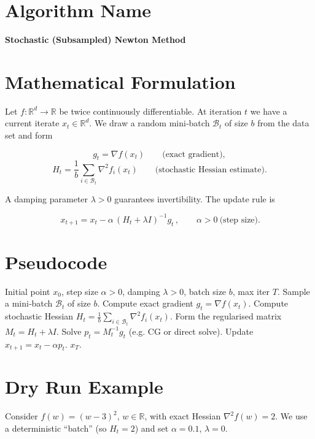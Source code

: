 \documentclass{article}
\newcommand{\R}{\mathbb{R}}
\begin{document}
\section*{Algorithm Name}
\textbf{Stochastic (Subsampled) Newton Method}  

\section*{Mathematical Formulation}
Let $f:\R^{d}\to\R$ be twice continuously differentiable.  
At iteration $t$ we have a current iterate $x_{t}\in\R^{d}$.  
We draw a random mini‑batch $\mathcal{B}_{t}$ of size $b$ from the data set and form

\[
g_{t}= \nabla f(x_{t})\qquad\text{(exact gradient)},
\]
\[
H_{t}= \frac{1}{b}\sum_{i\in\mathcal{B}_{t}} \nabla^{2} f_{i}(x_{t})\qquad\text{(stochastic Hessian estimate)}.
\]

A damping parameter $\lambda>0$ guarantees invertibility.  
The update rule is

\begin{equation}
\boxed{\,x_{t+1}=x_{t}-\alpha\,(H_{t}+\lambda I)^{-1} g_{t}\,},\qquad \alpha>0\ \text{(step size).}
\label{eq:update}
\end{equation}

\section*{Pseudocode}
\begin{algorithm}[H]
\caption{Stochastic Subsampled Newton}
\begin{algorithmic}[1]
\Require Initial point $x_{0}$, step size $\alpha>0$, damping $\lambda>0$, batch size $b$, max iter $T$.
    \State Sample a mini‑batch $\mathcal{B}_{t}$ of size $b$.
    \State Compute exact gradient $g_{t}= \nabla f(x_{t})$.
    \State Compute stochastic Hessian $H_{t}= \frac{1}{b}\sum_{i\in\mathcal{B}_{t}}\nabla^{2}f_{i}(x_{t})$.
    \State Form the regularised matrix $M_{t}=H_{t}+\lambda I$.
    \State Solve $p_{t}=M_{t}^{-1}g_{t}$ (e.g. CG or direct solve).
    \State Update $x_{t+1}=x_{t}-\alpha p_{t}$.
\EndFor
\State \Return $x_{T}$.
\end{algorithmic}
\end{algorithm}

\section*{Dry Run Example}
Consider $f(w)=(w-3)^{2}$, $w\in\R$, with exact Hessian $ \nabla^{2}f(w)=2$.  
We use a deterministic ``batch'' (so $H_{t}=2$) and set $\alpha=0.1$, $\lambda=0$.
\end{document}
